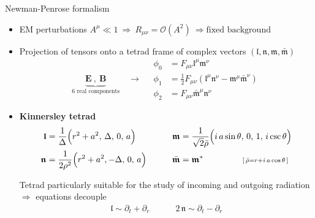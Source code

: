 \documentclass[9pt]{beamer}
\begin{document}
\begin{frame}{Newman-Penrose formalism}    
    \begin{itemize}
        \setlength\itemsep{1.2em}
        \item EM perturbations $A^\mu \ll 1 ~\Rightarrow~ R_{\mu\nu} = \mathcal{O}(A^2)  ~\Rightarrow\text{fixed background} $

        \item Projection of tensors onto a tetrad frame of complex vectors
        $(\bm{\mathfrak{l}},\bm{\mathfrak{n}},\bm{\mathfrak{m}},\bar{\bm{\mathfrak{m}}})$
        \begin{equation*}
            \underbrace{\mathbf{E} ~,~ \mathbf{B}}_\text{6 real components}
            \quad\longrightarrow\quad
            \boxed{
            \begin{aligned}
                \phi_0 &= F_{\mu\nu} \mathfrak{l}^\mu \mathfrak{m}^\nu \\
                \phi_1 &= \tfrac{1}{2} F_{\mu\nu} ( \mathfrak{l}^\mu \mathfrak{n}^\nu - \mathfrak{m}^\mu \bar{\mathfrak{m}}^\nu ) \\
                \phi_2 &= F_{\mu\nu} \bar{\mathfrak{m}}^\mu \mathfrak{n}^\nu 
            \end{aligned}
            }
        \end{equation*}
		
		\item \textbf{Kinnersley tetrad}
		\begin{alignat*}{3}
		\bm{\mathfrak{l}} &= \frac{1}{\Delta} \Big( r^2+a^2, \,\Delta, \,0, \,a \Big)&& \qquad\bm{\mathfrak{\texttt{}m}} = \frac{1}{\sqrt{2} \bar{\rho}} \Big( i \,a \sin\theta, \,0, \,1, \,i \csc\theta \Big) \\
		\bm{\mathfrak{n}} &= \frac{1}{2 \rho^2} \Big( r^2+a^2, -\Delta, \,0, \,a \Big) && \qquad\bar{\bm{\mathfrak{m}}} = \bm{\mathfrak{m}}^*
		\hspace*{1.6cm} {\scriptstyle [\,\bar{\rho} = r + i \,a \cos\theta \,]}
		\end{alignat*}
	
        Tetrad particularly suitable for the study of incoming and outgoing radiation $ \Rightarrow $ \alert{equations decouple}
        \begin{align*}
            \bm{\mathfrak{l}} \sim \partial_t + \partial_r \quad\qquad
            2\,\bm{\mathfrak{n}} \sim \partial_t - \partial_r
        \end{align*}


\end{itemize}
\end{frame}
\end{document}
